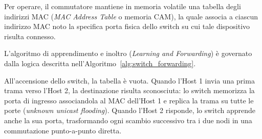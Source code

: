 \documentclass[11pt, a4paper]{article}
\begin{document}
Per operare, il commutatore mantiene in memoria volatile una tabella degli indirizzi MAC (\emph{MAC Address Table} o memoria CAM), la quale associa a ciascun indirizzo MAC noto la specifica porta fisica dello switch su cui tale dispositivo risulta connesso.


L'algoritmo di apprendimento e inoltro (\emph{Learning and Forwarding}) è governato dalla logica descritta nell'Algoritmo~\ref{alg:switch_forwarding}.

\begin{algorithm}[H]
    \caption{Apprendimento e Inoltro di Livello 2 nello Switch}
    \label{alg:switch_forwarding}
    \Inizializza\;
\end{algorithm}


All'accensione dello switch, la tabella è vuota. Quando l'Host 1 invia una prima trama verso l'Host 2, la destinazione risulta sconosciuta: lo switch memorizza la porta di ingresso associandola al MAC dell'Host 1 e replica la trama su tutte le porte (\emph{unknown unicast flooding}). Quando l'Host 2 risponde, lo switch apprende anche la sua porta, trasformando ogni scambio successivo tra i due nodi in una commutazione punto-a-punto diretta.
\end{document}
